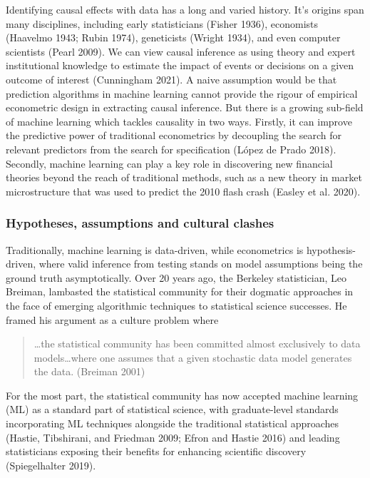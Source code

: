 \documentclass{article}
\begin{document}
Identifying causal effects with data has a long and varied history. It's
origins span many disciplines, including early statisticians (Fisher
1936), economists (Haavelmo 1943; Rubin 1974), geneticists (Wright
1934), and even computer scientists (Pearl 2009). We can view causal
inference as using theory and expert institutional knowledge to estimate
the impact of events or decisions on a given outcome of interest
(Cunningham 2021). A naive assumption would be that prediction
algorithms in machine learning cannot provide the rigour of empirical
econometric design in extracting causal inference. But there is a
growing sub-field of machine learning which tackles causality in two
ways. Firstly, it can improve the predictive power of traditional
econometrics by decoupling the search for relevant predictors from the
search for specification (López de Prado 2018). Secondly, machine
learning can play a key role in discovering new financial theories
beyond the reach of traditional methods, such as a new theory in market
microstructure that was used to predict the 2010 flash crash (Easley et
al. 2020).

\hypertarget{hypotheses-assumptions-and-cultural-clashes}{%
\subsubsection{Hypotheses, assumptions and cultural
clashes}\label{hypotheses-assumptions-and-cultural-clashes}}

Traditionally, machine learning is data-driven, while econometrics is
hypothesis-driven, where valid inference from testing stands on model
assumptions being the ground truth asymptotically. Over 20 years ago,
the Berkeley statistician, Leo Breiman, lambasted the statistical
community for their dogmatic approaches in the face of emerging
algorithmic techniques to statistical science successes. He framed his
argument as a culture problem where

\begin{quote}
\ldots the statistical community has been committed almost exclusively
to data models\ldots where one assumes that a given stochastic data
model generates the data. (Breiman 2001)
\end{quote}

For the most part, the statistical community has now accepted machine
learning (ML) as a standard part of statistical science, with
graduate-level standards incorporating ML techniques alongside the
traditional statistical approaches (Hastie, Tibshirani, and Friedman
2009; Efron and Hastie 2016) and leading statisticians exposing their
benefits for enhancing scientific discovery (Spiegelhalter 2019).
\end{document}

